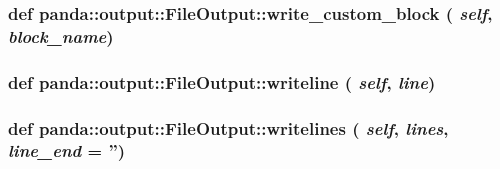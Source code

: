 \label{classpanda_1_1output_1_1FileOutput_ad5e62836f30b0d232e5ce5e7afc8a82c}
\hypertarget{classpanda_1_1output_1_1FileOutput_a2c4b2e7a79be29764ba9fadf21270b46}{
\subsubsection[{write\_\-custom\_\-block}]{\setlength{\rightskip}{0pt plus 5cm}def panda::output::FileOutput::write\_\-custom\_\-block ( {\em self}, \/   {\em block\_\-name})}}
\label{classpanda_1_1output_1_1FileOutput_a2c4b2e7a79be29764ba9fadf21270b46}
\hypertarget{classpanda_1_1output_1_1FileOutput_a00ecf28f1f063ea4d86f567e0e972140}{
\subsubsection[{writeline}]{\setlength{\rightskip}{0pt plus 5cm}def panda::output::FileOutput::writeline ( {\em self}, \/   {\em line})}}
\label{classpanda_1_1output_1_1FileOutput_a00ecf28f1f063ea4d86f567e0e972140}
\hypertarget{classpanda_1_1output_1_1FileOutput_afb1fa8ac2ea75e019c60ea695419bc8a}{
\subsubsection[{writelines}]{\setlength{\rightskip}{0pt plus 5cm}def panda::output::FileOutput::writelines ( {\em self}, \/   {\em lines}, \/   {\em line\_\-end} = {\ttfamily ''})}}
\label{classpanda_1_1output_1_1FileOutput_afb1fa8ac2ea75e019c60ea695419bc8a}


